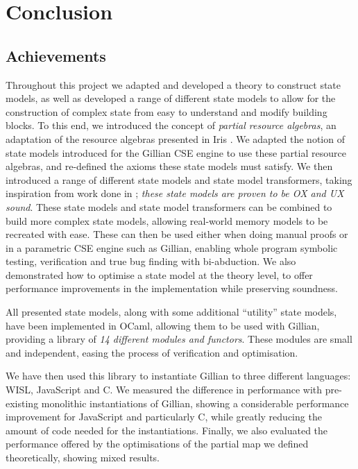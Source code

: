 \chapter{Conclusion} \label{chap:conclusion}

\section{Achievements}

Throughout this project we adapted and developed a theory to construct state models, as well as developed a range of different state models to allow for the construction of complex state from easy to understand and modify building blocks. To this end, we introduced the concept of \emph{partial resource algebras}, an adaptation of the resource algebras presented in Iris \cite{iris}. We adapted the notion of state models introduced for the Gillian CSE engine \cite{sacha-phd,cse2,gillan0} to use these partial resource algebras, and re-defined the axioms these state models must satisfy. We then introduced a range of different state models and state model transformers, taking inspiration from work done in \cite{iris,sacha-phd}; \emph{these state models are proven to be OX and UX sound}. These state models and state model transformers can be combined to build more complex state models, allowing real-world memory models to be recreated with ease. These can then be used either when doing manual proofs or in a parametric CSE engine such as Gillian, enabling whole program symbolic testing, verification and true bug finding with bi-abduction. We also demonstrated how to optimise a state model at the theory level, to offer performance improvements in the implementation while preserving soundness.

All presented state models, along with some additional ``utility'' state models, have been implemented in OCaml, allowing them to be used with Gillian, providing a library of \emph{14 different modules and functors}. These modules are small and independent, easing the process of verification and optimisation.

 We have then used this library to instantiate Gillian to three different languages: WISL, JavaScript and C. We measured the difference in performance with pre-existing monolithic instantiations of Gillian, showing a considerable performance improvement for JavaScript and particularly C, while greatly reducing the amount of code needed for the instantiations. Finally, we also evaluated the performance offered by the optimisations of the partial map we defined theoretically, showing mixed results.

